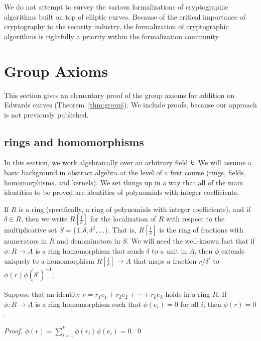 \documentclass{llncs}
\newcommand{\f}[1]{\frac{1}{#1}}
\begin{document}
We do not attempt to survey the various formalizations of
cryptographic algorithms built on top of elliptic curves.  Because of
the critical importance of cryptography to the security industry, the
formalization of cryptographic algorithms is rightfully a priority within
the formalization community.

\section{Group Axioms}\label{sec:axiom}

This section gives an elementary proof of the group axioms for
addition on Edwards curves (Theorem~\ref{thm:group}).  We include
proofs, because our approach is not previously published.



\subsection{rings and homomorphisms}

In this section, we work algebraically over an arbitrary field $k$.
We will assume a basic background in abstract algebra at the level of
a first course (rings, fields, homomorphisms, and kernels).  We set
things up in a way that all of the main identities to be proved are
identities of polynomials with integer coefficients.

If $R$ is a ring (specifically, a ring of polynomials with integer
coefficients), and if $\delta\in R$, then we write $R[\f{\delta}]$ for
the localization of $R$ with respect to the multiplicative set
$S=\{1,\delta,\delta^2,\ldots\}$.  That is, $R[\f{\delta}]$ is the
ring of fractions with numerators in $R$ and denominators in $S$.  We
will need the well-known fact that if $\phi:R\to A$ is a ring
homomorphism that sends $\delta$ to a unit in $A$, then $\phi$ extends
uniquely to a homomorphism $R[\f{\delta}]\to A$ that maps a fraction
$r/\delta^i$ to $\phi(r)\phi(\delta^i)^{-1}$.

\begin{lemma} Suppose that an identity $r = r_1 e_1 +
  r_2 e_2 +\cdots + r_k e_k$ holds in a ring $R$.  If $\phi:R\to A$ is
  a ring homomorphism such that $\phi(e_i) =0$ for all $i$, then
  $\phi(r)=0$.
\end{lemma}

\begin{proof}
$\phi(r) = \sum_{i=1}^k \phi(r_i) \phi(e_i) = 0.$
\qed\end{proof}
\end{document}

